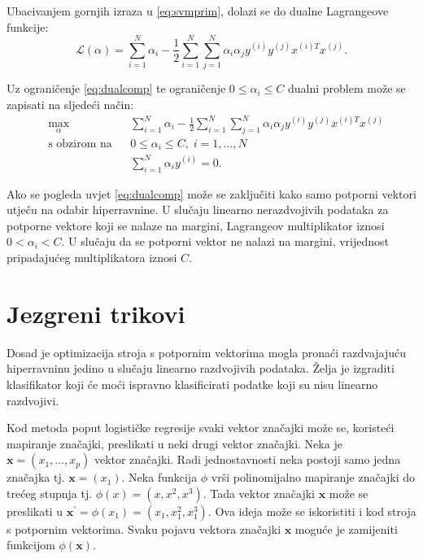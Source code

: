 \documentclass[times, utf8, zavrsni, numeric]{fer}
\begin{document}
Ubacivanjem gornjih izraza u \ref{eq:svmprim}, dolazi se do dualne Lagrangeove funkcije:
\begin{equation} \label{eq:svmdual}
  \mathcal{L}(\alpha) = \sum_{i=1}^{N} \alpha_i - 
  \frac{1}{2}\sum_{i=1}^{N}\sum_{j=1}^{N} \alpha_i\alpha_jy^{(i)}y^{(j)}x^{(i)T}x^{(j)}.
\end{equation}

Uz ograničenje \ref{eq:dualcomp} te ograničenje $0 \leq \alpha_i \leq C$ dualni problem može se zapisati
na sljedeći način:
\begin{equation} \label{eq:dualprob}
\begin{aligned}
& \underset{\alpha}{\text{max}}
& & \sum_{i=1}^{N} \alpha_i - 
  \frac{1}{2}\sum_{i=1}^{N}\sum_{j=1}^{N} \alpha_i\alpha_jy^{(i)}y^{(j)}x^{(i)T}x^{(j)}\\
& \text{s obzirom na}
& & 0 \leq \alpha_i \leq C, \; i = 1, \ldots, N \\
&&& \sum_{i=1}^{N} \alpha_iy^{(i)} = 0.
\end{aligned}
\end{equation}

Ako se pogleda uvjet \ref{eq:dualcomp} može se zaključiti kako samo potporni vektori utječu na
odabir hiperravnine. U slučaju linearno nerazdvojivih podataka za potporne vektore koji se nalaze
na margini, Lagrangeov multiplikator iznosi $0 < \alpha_i < C$. U slučaju da se potporni vektor ne
nalazi na margini, vrijednost pripadajućeg multiplikatora iznosi $C$.

\section{Jezgreni trikovi} \label{jezgra}
Dosad je optimizacija stroja s potpornim vektorima mogla pronaći razdvajajuću hiperravninu jedino u
slučaju linearno razdvojivih podataka. 
Želja je izgraditi klasifikator koji će moći ispravno klasificirati podatke koji su nisu linearno 
razdvojivi.

\par Kod metoda poput logističke regresije svaki vektor značajki može se, koristeći mapiranje značajki,
preslikati u neki drugi vektor značajki.
Neka je $\mathbf{x}=(x_1, \ldots, x_p)$ vektor značajki. 
Radi jednostavnosti neka postoji samo jedna značajka tj. $\mathbf{x} = (x_1)$.
Neka funkcija $\phi$ vrši polinomijalno mapiranje značajki do trećeg stupnja tj. 
$\phi(x) = (x, x^2, x^3)$. 
Tada vektor značajki $\mathbf{x}$ može se preslikati u 
$\mathbf{x}^{'} = \phi(x_1) = (x_1, x_1^2, x_1^3)$.
Ova ideja može se iskoristiti i kod stroja s potpornim vektorima.
Svaku pojavu vektora značajki $\mathbf{x}$ moguće je zamijeniti funkcijom $\phi(\mathbf{x})$.
\end{document}
